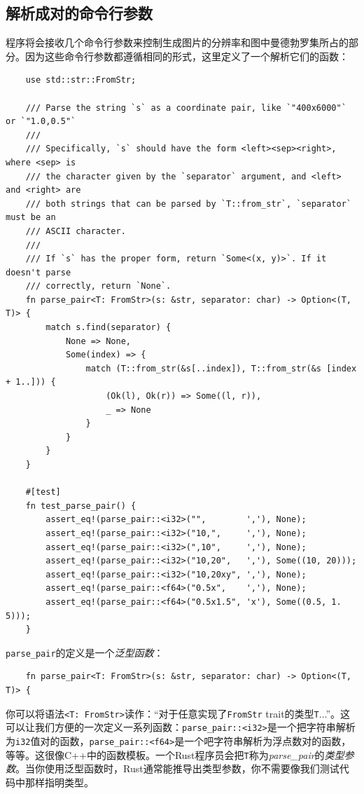 \subsection{解析成对的命令行参数}
程序将会接收几个命令行参数来控制生成图片的分辨率和图中曼德勃罗集所占的部分。因为这些命令行参数都遵循相同的形式，这里定义了一个解析它们的函数：
\begin{verbatim}
    use std::str::FromStr;

    /// Parse the string `s` as a coordinate pair, like `"400x6000"` or `"1.0,0.5"`
    ///
    /// Specifically, `s` should have the form <left><sep><right>, where <sep> is
    /// the character given by the `separator` argument, and <left> and <right> are
    /// both strings that can be parsed by `T::from_str`, `separator` must be an
    /// ASCII character.
    ///
    /// If `s` has the proper form, return `Some<(x, y)>`. If it doesn't parse
    /// correctly, return `None`.
    fn parse_pair<T: FromStr>(s: &str, separator: char) -> Option<(T, T)> {
        match s.find(separator) {
            None => None,
            Some(index) => {
                match (T::from_str(&s[..index]), T::from_str(&s [index + 1..])) {
                    (Ok(l), Ok(r)) => Some((l, r)),
                    _ => None
                }
            }
        }
    }

    #[test]
    fn test_parse_pair() {
        assert_eq!(parse_pair::<i32>("",        ','), None);
        assert_eq!(parse_pair::<i32>("10,",     ','), None);
        assert_eq!(parse_pair::<i32>(",10",     ','), None);
        assert_eq!(parse_pair::<i32>("10,20",   ','), Some((10, 20)));
        assert_eq!(parse_pair::<i32>("10,20xy", ','), None);
        assert_eq!(parse_pair::<f64>("0.5x",    ','), None);
        assert_eq!(parse_pair::<f64>("0.5x1.5", 'x'), Some((0.5, 1. 5)));
    }
\end{verbatim}

\texttt{parse\_pair}的定义是一个\emph{泛型函数}：
\begin{verbatim}
    fn parse_pair<T: FromStr>(s: &str, separator: char) -> Option<(T, T)> {
\end{verbatim}

你可以将语法\texttt{<T: FromStr>}读作：“对于任意实现了\texttt{FromStr} trait的类型\texttt{T}...”。这可以让我们方便的一次定义一系列函数：\texttt{parse\_pair::<i32>}是一个把字符串解析为\texttt{i32}值对的函数，\texttt{parse\_pair::<f64>}是一个吧字符串解析为浮点数对的函数，等等。这很像C++中的函数模板。一个Rust程序员会把\texttt{T}称为\emph{parse\_pair}的\emph{类型参数}。当你使用泛型函数时，Rust通常能推导出类型参数，你不需要像我们测试代码中那样指明类型。

